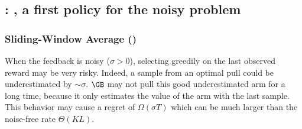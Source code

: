 \subsection{\citet{levine2017rotting}: {\wSWA}, a first policy for the noisy problem}
\label{ss:SWA}
\subsubsection{Sliding-Window Average ({\SWA})}
When the feedback is noisy ($\sigma > 0$), selecting greedily on the last observed reward may be very risky. Indeed, a sample from an optimal pull could be underestimated by $\sim \sigma$. $\GB$ may not pull this good underestimated arm for a long time, because it only estimates the value of the arm with the last sample. This behavior may cause a regret of $\Omega(\sigma T)$ which can be much larger than the noise-free rate $\Theta(KL)$.

